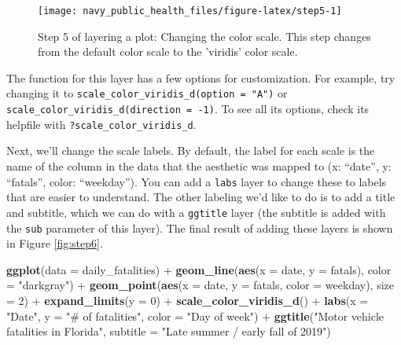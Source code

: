 \documentclass[]{tufte-book}
\newenvironment{Shaded}{}{}
\newcommand{\DataTypeTok}[1]{\textcolor[rgb]{0.56,0.13,0.00}{#1}}
\newcommand{\DecValTok}[1]{\textcolor[rgb]{0.25,0.63,0.44}{#1}}
\newcommand{\KeywordTok}[1]{\textcolor[rgb]{0.00,0.44,0.13}{\textbf{#1}}}
\newcommand{\NormalTok}[1]{#1}
\newcommand{\OperatorTok}[1]{\textcolor[rgb]{0.40,0.40,0.40}{#1}}
\newcommand{\StringTok}[1]{\textcolor[rgb]{0.25,0.44,0.63}{#1}}
\begin{document}
\begin{figure*}
\texttt{[image: navy\_public\_health\_files/figure-latex/step5-1]} \caption[Step 5 of layering a plot]{Step 5 of layering a plot: Changing the color scale. This step changes from the default color scale to the 'viridis' color scale.}\label{fig:step5}
\end{figure*}

The function for this layer has a few options for customization. For example, try
changing it to \texttt{scale\_color\_viridis\_d(option\ =\ "A")} or
\texttt{scale\_color\_viridis\_d(direction\ =\ -1)}. To see all its options, check its
helpfile with \texttt{?scale\_color\_viridis\_d}.

Next, we'll change the scale labels. By default, the label for each scale is the
name of the column in the data that the aesthetic was mapped to (x: ``date'',
y: ``fatals'', color: ``weekday''). You can add a \texttt{labs} layer to change these
to labels that are easier to understand. The other
labeling we'd like to do is to add a title and subtitle, which we can do with
a \texttt{ggtitle} layer (the subtitle is added with the \texttt{sub} parameter of this layer).
The final result of adding these layers is shown in Figure \ref{fig:step6}.

\begin{Shaded}
\begin{Highlighting}[]
\KeywordTok{ggplot}\NormalTok{(}\DataTypeTok{data =}\NormalTok{ daily_fatalities) }\OperatorTok{+}\StringTok{ }\KeywordTok{geom_line}\NormalTok{(}\KeywordTok{aes}\NormalTok{(}\DataTypeTok{x =}\NormalTok{ date, }
    \DataTypeTok{y =}\NormalTok{ fatals), }\DataTypeTok{color =} \StringTok{"darkgray"}\NormalTok{) }\OperatorTok{+}\StringTok{ }\KeywordTok{geom_point}\NormalTok{(}\KeywordTok{aes}\NormalTok{(}\DataTypeTok{x =}\NormalTok{ date, }
    \DataTypeTok{y =}\NormalTok{ fatals, }\DataTypeTok{color =}\NormalTok{ weekday), }\DataTypeTok{size =} \DecValTok{2}\NormalTok{) }\OperatorTok{+}\StringTok{ }
\StringTok{    }\KeywordTok{expand_limits}\NormalTok{(}\DataTypeTok{y =} \DecValTok{0}\NormalTok{) }\OperatorTok{+}\StringTok{ }\KeywordTok{scale_color_viridis_d}\NormalTok{() }\OperatorTok{+}\StringTok{ }
\StringTok{    }\KeywordTok{labs}\NormalTok{(}\DataTypeTok{x =} \StringTok{"Date"}\NormalTok{, }\DataTypeTok{y =} \StringTok{"# of fatalities"}\NormalTok{, }\DataTypeTok{color =} \StringTok{"Day of week"}\NormalTok{) }\OperatorTok{+}\StringTok{ }
\StringTok{    }\KeywordTok{ggtitle}\NormalTok{(}\StringTok{"Motor vehicle fatalities in Florida"}\NormalTok{, }
        \DataTypeTok{subtitle =} \StringTok{"Late summer / early fall of 2019"}\NormalTok{)}
\end{Highlighting}
\end{Shaded}
\end{document}
